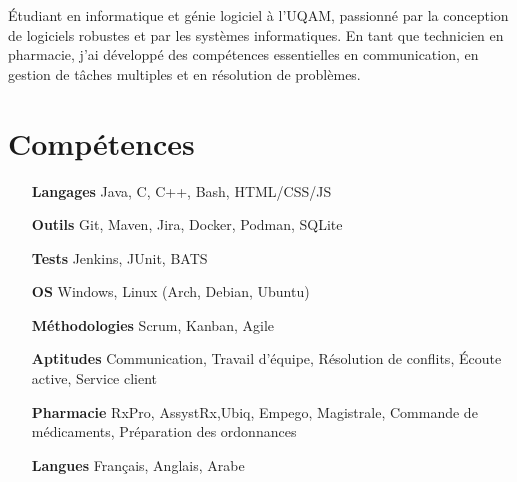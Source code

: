 \documentclass[letterpaper,10pt]{article}
\begin{document}


  Étudiant en informatique et génie logiciel à l'UQAM, passionné par la conception de logiciels robustes et par les systèmes informatiques. En tant que technicien en pharmacie, j'ai développé des compétences essentielles en communication, en gestion de tâches multiples et en résolution de problèmes.


  \section{Compétences}

  \begin{multicols}{2}
    \begin{itemize}[itemsep=-2px, parsep=5pt, leftmargin=75pt]
      \item[\textbf{Langages}] Java, C, C++, Bash, HTML/CSS/JS
      \item[\textbf{Outils}] Git, Maven, Jira, Docker, Podman, SQLite
      \item[\textbf{Tests}] Jenkins, JUnit, BATS
      \item[\textbf{OS}]  Windows, Linux (Arch, Debian, Ubuntu)
      \item[\textbf{Méthodologies}]  Scrum, Kanban, Agile
      \item[\textbf{Aptitudes}]  Communication, Travail d'équipe, Résolution de conflits, Écoute active, Service client
      \item[\textbf{Pharmacie}]  RxPro, AssystRx,Ubiq, Empego, Magistrale, Commande de médicaments, Préparation des ordonnances
      \item[\textbf{Langues}]  Français, Anglais, Arabe
    \end{itemize}
  \end{multicols}
\end{document}
